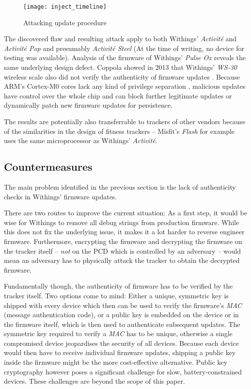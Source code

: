 \documentclass[english]{lni}
\begin{document}
\begin{figure}[htb]
	\caption{Attacking update procedure}
	\label{fig:attacking_update_procedure}
	\centering
	\texttt{[image: inject\_timeline]}
\end{figure}

The discovered flaw and resulting attack apply to both Withings' \emph{Activité} and \emph{Activité Pop} and presumably \emph{Activité Steel} (At the time of writing, no device for testing was available). Analysis of the firmware of Withings' \emph{Pulse Ox} reveals the same underlying design defect. Coppola showed in 2013 that Withings' \emph{WS-30} wireless scale also did not verify the authenticity of firmware updates \cite{Coppola}. Because ARM's Cortex-M0 cores lack any kind of privilege separation \cite[p.33]{ARMCortexM0}, malicious updates have control over the whole chip and can block further legitimate updates or dynamically patch new firmware updates for persistence.

The results are potentially also transferrable to trackers of other vendors because of the similarities in the design of fitness trackers -- Misfit's \emph{Flash} for example uses the same microprocessor as Withings' \emph{Activité}.

\subsection{Countermeasures}
\label{countermeasures}

The main problem identified in the previous section is the lack of authenticity checks in Withings' firmware updates.

There are two routes to improve the current situation: As a first step, it would be wise for Withings to remove all debug strings from production firmware. While this does not fix the underlying issue, it makes it a lot harder to reverse engineer firmware. Furthermore, encrypting the firmware and decrypting the firmware on the tracker itself -- \emph{not} on the PCD which is controlled by an adversary -- would mean an adversary has to physically attack the tracker to obtain the decrypted firmware.

Fundamentally though, the authenticity of firmware has to be verified by the tracker itself. Two options come to mind: Either a unique, symmetric key is shipped with every device which then can be used to verify the firmware's \emph{MAC} (message authentication code), or a public key is embedded on the device or in the firmware itself, which is then used to authenticate subsequent updates. The symmetric key required to verify a \emph{MAC} has to be unique, otherwise a single compromised device jeopardises the security of all devices. Because each device would then have to receive individual firmware updates, shipping a public key inside the firmware might be the more cost-effective alternative. Public key cryptography however poses a significant challenge for slow, battery-constrained devices. These challenges are beyond the scope of this paper.
\end{document}
